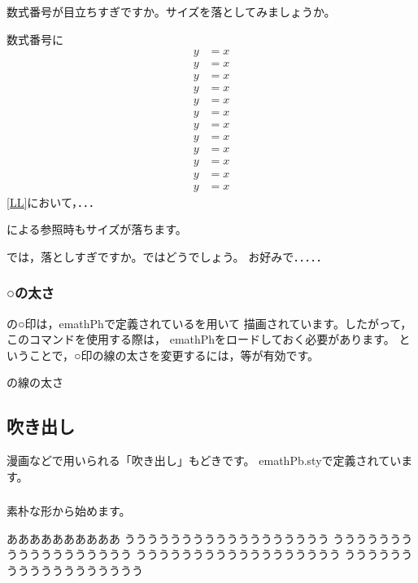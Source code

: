 数式番号が目立ちすぎですか。サイズを落としてみましょうか。

\begin{showEx}{数式番号に}
\def\tagform#1{%
  \footnotesize\emPmaru{#1}}
\begin{align}
  y &= x\\
  y &= x\\
  y &= x\\
  y &= x\\
  y &= x\\
  y &= x\\
  y &= x\\
  y &= x\\
  y &= x\\
  y &= x\\
  y &= x\label{LL}\\
  y &= x
\end{align}
\eqref{LL}において，．．．
\end{showEx}

による参照時もサイズが落ちます。

では，落としすぎですか。ではどうでしょう。
お好みで．．．．．

\subsubsection{○の太さ}
の○印は，\textsf{emathPh}で定義されているを用いて
描画されています。したがって，このコマンドを使用する際は，
\textsf{emathPh}をロードしておく必要があります。
ということで，○印の線の太さを変更するには，等が有効です。
\begin{showEx}{の線の太さ}
\hspace{1zw}%
\thicklines{}
\end{showEx}

\subsection{吹き出し}
漫画などで用いられる「吹き出し」もどきです。
\textsf{emathPb.sty}で定義されています。

\subsubsection{}
素朴な形から始めます。

\begin{showEx}{}
ああああああああああ%
%
うううううううううううううううううう
うううううううううううううううううう
うううううううううううううううううう
うううううううううううううううううう
\end{showEx}

